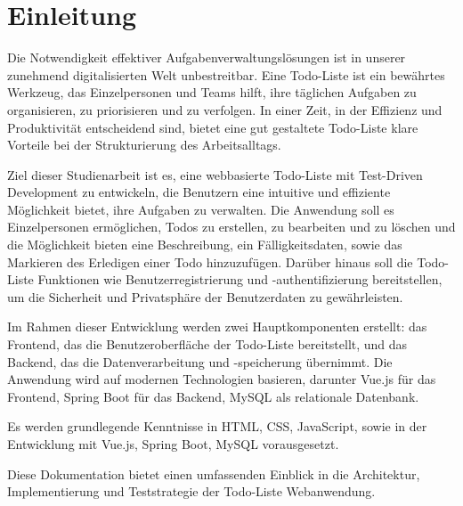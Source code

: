 \chapter{Einleitung}

Die Notwendigkeit effektiver Aufgabenverwaltungslösungen ist in unserer zunehmend digitalisierten Welt unbestreitbar. Eine Todo-Liste ist ein bewährtes Werkzeug, das Einzelpersonen und Teams hilft, ihre täglichen Aufgaben zu organisieren, zu priorisieren und zu verfolgen. In einer Zeit, in der Effizienz und Produktivität entscheidend sind, bietet eine gut gestaltete Todo-Liste klare Vorteile bei der Strukturierung des Arbeitsalltags.

Ziel dieser Studienarbeit ist es, eine webbasierte Todo-Liste mit Test-Driven Development zu entwickeln, die Benutzern eine intuitive und effiziente Möglichkeit bietet, ihre Aufgaben zu verwalten. Die Anwendung soll es Einzelpersonen ermöglichen, Todos zu erstellen, zu bearbeiten und zu löschen und die Möglichkeit bieten eine Beschreibung, ein Fälligkeitsdaten, sowie das Markieren des Erledigen einer Todo hinzuzufügen. Darüber hinaus soll die Todo-Liste Funktionen wie Benutzerregistrierung und -authentifizierung bereitstellen, um die Sicherheit und Privatsphäre der Benutzerdaten zu gewährleisten.

Im Rahmen dieser Entwicklung werden zwei Hauptkomponenten erstellt: das Frontend, das die Benutzeroberfläche der Todo-Liste bereitstellt, und das Backend, das die Datenverarbeitung und -speicherung übernimmt. Die Anwendung wird auf modernen Technologien basieren, darunter Vue.js für das Frontend, Spring Boot für das Backend, MySQL als relationale Datenbank.


Es werden grundlegende Kenntnisse in HTML, CSS, JavaScript, sowie in der Entwicklung mit Vue.js, Spring Boot, MySQL vorausgesetzt.

Diese Dokumentation bietet einen umfassenden Einblick in die Architektur, Implementierung und Teststrategie der Todo-Liste Webanwendung.